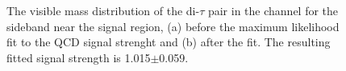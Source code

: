\begin{figure}[h!]
\begin{center}
\end{center}
\caption{The visible mass distribution of the di-$\tau$ pair in the \etau channel for the sideband near the signal region, (a) before
the maximum likelihood fit to the QCD signal strenght and (b) after the fit. The resulting fitted signal strength is 1.015$\pm$0.059.}
\label{fig:mssm_qcdosss_etnear}
\end{figure}

